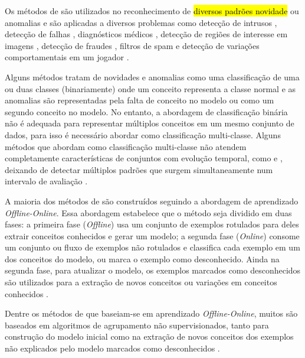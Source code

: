 
Os métodos de \nd são utilizados no reconhecimento de \hl{diversos padrões novidade}
ou anomalias e são aplicadas a diversos problemas como
detecção de intrusos \cite{Coull2003,Spinosa2008,Viegas2019,Cassales2019a},
detecção de falhas \cite{Zhang2006},
diagnósticos médicos \cite{Perner2009},
detecção de regiões de interesse em imagens \cite{singh2004approach},
detecção de fraudes \cite{wang2003mining,Abdallah201690}, 
filtros de spam \cite{Hayat2010dct} e
detecção de variações comportamentais em um jogador \cite{Vallim20136258}.


Alguns métodos tratam de novidades e anomalias como uma classificação de uma
ou duas classes (binariamente) onde um conceito representa a classe normal e
as anomalias são representadas pela falta de conceito no modelo ou
como um segundo conceito no modelo.
No entanto, a abordagem de classificação binária não é adequada para representar
múltiplos conceitos em um mesmo conjunto de dados, para isso é necessário abordar
\nd como classificação multi-classe.
Alguns métodos que abordam \nd como classificação multi-classe não
atendem completamente características de conjuntos com evolução temporal,
como \evolution e \drift, deixando de detectar múltiplos padrões que surgem
simultaneamente num intervalo de avaliação \cite{Faria2016nd,Gama2010}.

A maioria dos métodos de \nd são construídos seguindo a abordagem de aprendizado
\emph{Offline-Online}. Essa abordagem estabelece que o método seja dividido em
duas fases:
a primeira fase (\emph{Offline}) usa um conjunto de exemplos rotulados para
deles extrair conceitos conhecidos e gerar um modelo;
a segunda fase (\emph{Online}) consome um conjunto ou fluxo de exemplos não
rotulados e classifica cada exemplo em um dos conceitos do modelo, ou marca o
exemplo como desconhecido.
Ainda na segunda fase, para atualizar o modelo, os exemplos marcados como
desconhecidos são utilizados para a extração de novos conceitos ou variações em
conceitos conhecidos \cite{Gama2010}.

Dentre os métodos de \nd que baseiam-se em aprendizado \emph{Offline-Online},
muitos são baseados em algoritmos de agrupamento não supervisionados, tanto
para construção do modelo inicial como na extração de novos conceitos dos
exemplos não explicados pelo modelo marcados como desconhecidos
\cite{Spinosa2009ollinda,Masud2010ECSMiner,Faria2013}.

